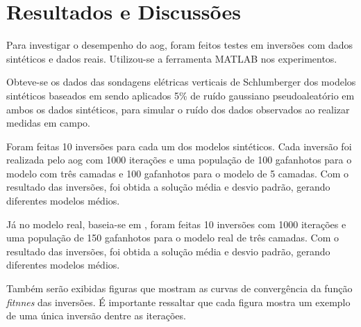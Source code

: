 

\chapter{Resultados e Discussões}
\label{cha:resultados-e-discussoes}

Para investigar o desempenho do \ac{aog}, foram feitos testes em inversões com dados sintéticos e dados reais. Utilizou-se a ferramenta MATLAB nos experimentos.

Obteve-se os dados das sondagens elétricas verticais de Schlumberger dos modelos sintéticos baseados em  sendo aplicados 5\% de ruído gaussiano pseudoaleatório em ambos os dados sintéticos, para simular o ruído dos dados observados ao realizar medidas em campo. 

Foram feitas 10 inversões para cada um dos modelos sintéticos. Cada inversão foi realizada pelo \ac{aog} com 1000 iterações e uma população de 100 gafanhotos para o modelo com três camadas e 100 gafanhotos para o modelo de 5 camadas. Com o resultado das inversões, foi obtida a solução média e desvio padrão, gerando diferentes modelos médios.

Já no modelo real, baseia-se em , foram feitas 10 inversões com 1000 iterações e uma população de 150 gafanhotos para o modelo real de três camadas. Com o resultado das inversões, foi obtida a solução média e desvio padrão, gerando diferentes modelos médios.

Também serão exibidas figuras que mostram as curvas de convergência da função \textit{fitnnes} das inversões. É importante ressaltar que cada figura mostra um exemplo de uma única inversão dentre as iterações.






